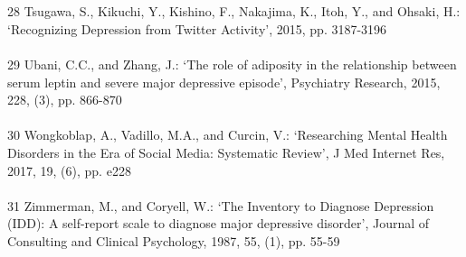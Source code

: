 \documentclass[runningheads]{llncs}
\begin{document}
\begin{thebibliography}{8}
\\\\
28	Tsugawa, S., Kikuchi, Y., Kishino, F., Nakajima, K., Itoh, Y., and Ohsaki, H.: ‘Recognizing Depression from Twitter Activity’, 2015, pp. 3187-3196
\\\\
29	Ubani, C.C., and Zhang, J.: ‘The role of adiposity in the relationship between serum leptin and severe major depressive episode’, Psychiatry Research, 2015, 228, (3), pp. 866-870
\\\\
30	Wongkoblap, A., Vadillo, M.A., and Curcin, V.: ‘Researching Mental Health Disorders in the Era of Social Media: Systematic Review’, J Med Internet Res, 2017, 19, (6), pp. e228
\\\\
31	Zimmerman, M., and Coryell, W.: ‘The Inventory to Diagnose Depression (IDD): A self-report scale to diagnose major depressive disorder’, Journal of Consulting and Clinical Psychology, 1987, 55, (1), pp. 55-59

%
%
%
\end{thebibliography}
\end{document}
